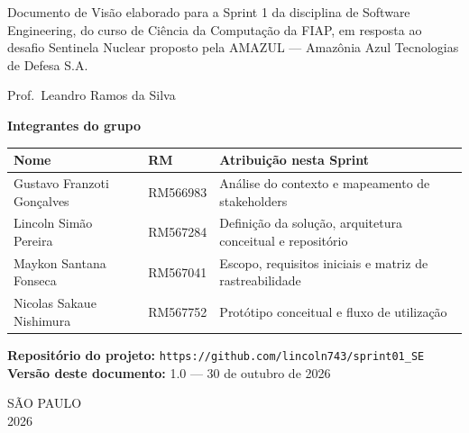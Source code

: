 \documentclass[12pt,a4paper,oneside]{article}
\newcommand{\cab}[1]{\textbf{\footnotesize #1}}
\begin{document}
\vspace{1.4cm}
\begin{flushright}
\begin{minipage}{0.54\textwidth}
\singlespacing\small
Documento de Visão elaborado para a Sprint 1 da disciplina de Software
Engineering, do curso de Ciência da Computação da FIAP, em resposta ao desafio
Sentinela Nuclear proposto pela AMAZUL — Amazônia Azul Tecnologias de Defesa
S.A.

\vspace{6pt}
Prof.\ Leandro Ramos da Silva
\end{minipage}
\end{flushright}

\vspace{1.4cm}
\begin{center}
\begin{minipage}{0.88\textwidth}
\singlespacing\small
\textbf{Integrantes do grupo}\\[6pt]
\begin{tabularx}{\textwidth}{L{6.6cm} L{3.0cm} X}
\toprule
\cab{Nome} & \cab{RM} & \cab{Atribuição nesta Sprint} \\
\midrule
Gustavo Franzoti Gonçalves & RM566983 & Análise do contexto e mapeamento de
stakeholders \\
Lincoln Simão Pereira & RM567284 & Definição da solução, arquitetura
conceitual e repositório \\
Maykon Santana Fonseca & RM567041 & Escopo, requisitos iniciais e matriz de
rastreabilidade \\
Nicolas Sakaue Nishimura & RM567752 & Protótipo conceitual e fluxo de
utilização \\
\bottomrule
\end{tabularx}

\vspace{12pt}
\textbf{Repositório do projeto:}
\texttt{https://github.com/lincoln743/sprint01\_SE}\\[4pt]
\textbf{Versão deste documento:} 1.0 — 30 de outubro de 2026
\end{minipage}
\end{center}

\vfill
\begin{center}
{\normalsize SÃO PAULO\\2026\par}
\end{center}
\newpage

\thispagestyle{empty}
\tableofcontents
\newpage
\setcounter{page}{4}
\end{document}
